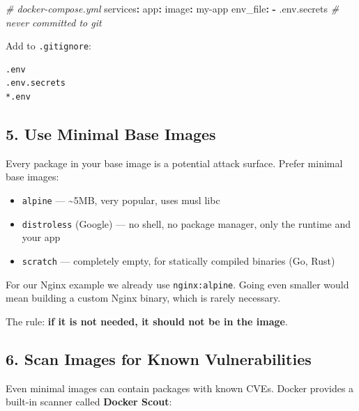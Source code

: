 \documentclass[11pt,american,a4paper,]{book}
\providecommand{\tightlist}{%
  \setlength{\itemsep}{2pt}\setlength{\parskip}{0pt}}
\newenvironment{Shaded}{}{}
\newcommand{\AttributeTok}[1]{\textcolor[rgb]{0.49,0.56,0.16}{#1}}
\newcommand{\CommentTok}[1]{\textcolor[rgb]{0.38,0.63,0.69}{\textit{#1}}}
\newcommand{\FunctionTok}[1]{\textcolor[rgb]{0.02,0.16,0.49}{#1}}
\newcommand{\KeywordTok}[1]{\textcolor[rgb]{0.00,0.44,0.13}{\textbf{#1}}}
\begin{document}
\begin{Shaded}
\begin{Highlighting}[]
\CommentTok{\# docker{-}compose.yml}
\FunctionTok{services}\KeywordTok{:}
\AttributeTok{  }\FunctionTok{app}\KeywordTok{:}
\AttributeTok{    }\FunctionTok{image}\KeywordTok{:}\AttributeTok{ my{-}app}
\AttributeTok{    }\FunctionTok{env\_file}\KeywordTok{:}
\AttributeTok{      }\KeywordTok{{-}}\AttributeTok{ .env.secrets}\CommentTok{   \# never committed to git}
\end{Highlighting}
\end{Shaded}

Add to \texttt{.gitignore}:

\begin{verbatim}
.env
.env.secrets
*.env
\end{verbatim}

\subsection{5. Use Minimal Base Images}\label{use-minimal-base-images}

Every package in your base image is a potential attack surface. Prefer
minimal base images:

\begin{itemize}
\tightlist
\item
  \texttt{alpine} --- \textasciitilde5MB, very popular, uses musl libc
\item
  \texttt{distroless} (Google) --- no shell, no package manager, only
  the runtime and your app
\item
  \texttt{scratch} --- completely empty, for statically compiled
  binaries (Go, Rust)
\end{itemize}

For our Nginx example we already use \texttt{nginx:alpine}. Going even
smaller would mean building a custom Nginx binary, which is rarely
necessary.

The rule: \textbf{if it is not needed, it should not be in the image}.

\subsection{6. Scan Images for Known
Vulnerabilities}\label{scan-images-for-known-vulnerabilities}

Even minimal images can contain packages with known CVEs. Docker
provides a built-in scanner called \textbf{Docker Scout}:
\end{document}
